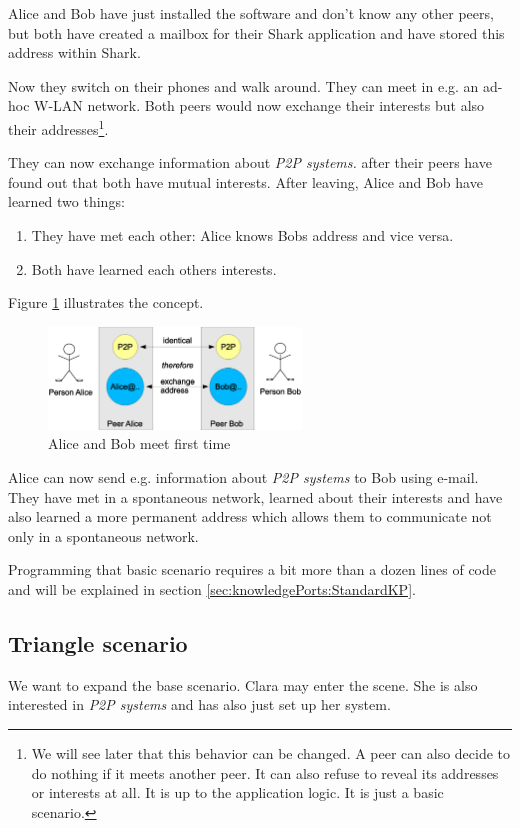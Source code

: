 Alice and Bob have just installed the software and don't know any other peers, but both have created a mailbox for their Shark application and have stored this address within Shark.

Now they switch on their phones and walk around. They can meet in e.g. an ad-hoc W-LAN network. Both peers would now exchange their interests but also their addresses\footnote{We will see later that this behavior can be changed. A peer can also decide to do nothing if it meets another peer. It can also refuse to reveal its addresses or interests at all. It is up to the application logic. It is just a basic scenario.}.

They can now exchange information about {\it P2P systems.} after their peers have found out that both have mutual interests. After leaving, Alice and Bob have learned two things:

\begin{enumerate}
    \item They have met each other: Alice knows Bobs address and vice versa.
    \item Both have learned each others interests.
\end{enumerate}

Figure \ref{fig:basisscenario} illustrates the concept.

\begin{figure}[t]
\centering
\includegraphics[width=0.60\textwidth]{basisscenario.eps}
\caption{Alice and Bob meet first time}
\label{fig:basisscenario}
\end{figure}

Alice can now send e.g. information about {\it P2P systems} to Bob using e-mail.
They have met in a spontaneous network, learned about their interests and have also learned a more permanent address which allows them to communicate not only in a spontaneous network.

Programming that basic scenario requires a bit more than a dozen lines of code and will be explained in section \ref{sec:knowledgePorts:StandardKP}.

\subsection{Triangle scenario}
We want to expand the base scenario. Clara may enter the scene. She is also interested in {\it P2P systems} and has also just set up her system.


